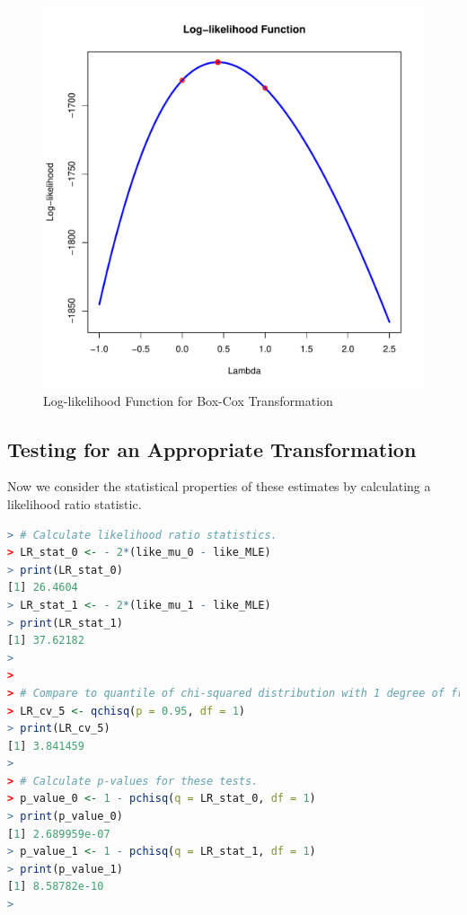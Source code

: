 \documentclass[11pt]{book}
\begin{document}
\begin{figure}[h!]
  \centering
  \includegraphics[scale = 0.5, keepaspectratio=true]{../Figures/box_cox_loglike_uni}
  \caption{Log-likelihood Function for Box-Cox Transformation} \label{fig:box_cox_loglike_uni}
\end{figure}


\pagebreak
\subsection{Testing for an Appropriate Transformation}

Now we consider the statistical properties of these estimates
by calculating a likelihood ratio statistic.

\begin{lstlisting}[language=R]
> # Calculate likelihood ratio statistics.
> LR_stat_0 <- - 2*(like_mu_0 - like_MLE)
> print(LR_stat_0)
[1] 26.4604
> LR_stat_1 <- - 2*(like_mu_1 - like_MLE)
> print(LR_stat_1)
[1] 37.62182
> 
> 
> # Compare to quantile of chi-squared distribution with 1 degree of freedom.
> LR_cv_5 <- qchisq(p = 0.95, df = 1)
> print(LR_cv_5)
[1] 3.841459
> 
> # Calculate p-values for these tests.
> p_value_0 <- 1 - pchisq(q = LR_stat_0, df = 1)
> print(p_value_0)
[1] 2.689959e-07
> p_value_1 <- 1 - pchisq(q = LR_stat_1, df = 1)
> print(p_value_1)
[1] 8.58782e-10
> 
\end{lstlisting}
\end{document}
